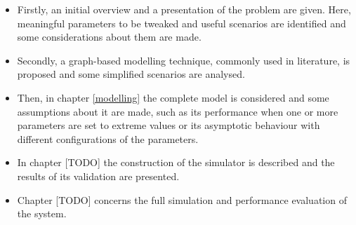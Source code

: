 \begin{itemize}
    \item Firstly, an initial overview and a presentation of the problem are
    given. Here, meaningful parameters to be tweaked and useful scenarios are
    identified and some considerations about them are made.
    \item Secondly, a graph-based modelling technique, commonly used in
    literature, is proposed and some simplified scenarios are analysed.
    \item Then, in chapter \ref{modelling} the complete model is considered and
    some assumptions about it are made, such as its performance when one or more
    parameters are set to extreme values or its asymptotic behaviour with
    different configurations of the parameters.
    \item In chapter [TODO] the construction of the simulator is described and
    the results of its validation are presented.
    \item Chapter [TODO] concerns the full simulation and performance evaluation
    of the system.
\end{itemize}
